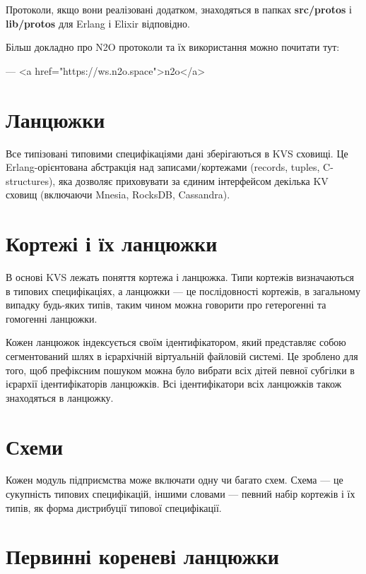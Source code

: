         Протоколи, якщо вони реалізовані додатком,
           знаходяться в папках \textbf{src/protos} і \textbf{lib/protos}
           для Erlang і Elixir відповідно.

        Більш докладно про N2O протоколи та їх використання
           можно почитати тут:

        — <a href="https://ws.n2o.space">n2o</a>

        \section{Ланцюжки}

        Все типізовані типовими специфікаціями дані зберігаються в KVS сховищі.
           Це Erlang-орієнтована абстракція над
           записами/кортежами (records, tuples, C-structures), яка
           дозволяє приховувати за єдиним інтерфейсом декілька KV сховищ (включаючи
           Mnesia, RocksDB, Cassandra).

        \section{Кортежі і їх ланцюжки}

        В основі KVS лежать поняття кортежа і ланцюжка. Типи кортежів визначаються
           в типових специфікаціях, а ланцюжки — це послідовності кортежів,
           в загальному випадку будь-яких типів, таким чином можна говорити про гетерогенні та гомогенні ланцюжки.

        Кожен ланцюжок індексується своїм ідентифікатором, який представляє
           собою сегментований шлях в ієрархічній віртуальній файловій системі.
           Це зроблено для того, щоб префіксним пошуком можна було вибрати всіх
           дітей певної субгілки в ієрархії ідентифікаторів ланцюжків. Всі ідентифікатори
           всіх ланцюжків також знаходяться в ланцюжку.

        \section{Схеми}

        Кожен модуль підприємства може включати одну чи багато схем.
           Схема — це сукупність типових специфікацій, іншими словами — певний набір
           кортежів і їх типів, як форма дистрибуції
           типової специфікації.

        \section{Первинні кореневі ланцюжки}

